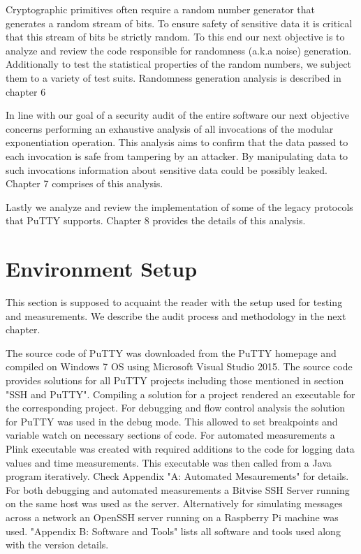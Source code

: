 \documentclass{report}
\begin{document}
Cryptographic primitives often require a random number generator that generates a random stream of bits. To ensure safety of sensitive data it is critical that this stream of bits be strictly random. To this end our next objective is to analyze and review the code responsible for randomness (a.k.a noise) generation. Additionally to test the statistical properties of the random numbers, we subject them to a variety of test suits. Randomness generation analysis is described in chapter 6\par
In line with our goal of a security audit of the entire software our next objective concerns performing an exhaustive analysis of all invocations of the modular exponentiation operation. This analysis aims to confirm that the data passed to each invocation is safe from tampering by an attacker. By manipulating data to such invocations information about sensitive data could be possibly leaked. Chapter 7 comprises of this analysis.\par
Lastly we analyze and review the implementation of some of the legacy protocols that PuTTY supports. Chapter 8 provides the details of this analysis.\par
\section{Environment Setup}
This section is supposed to acquaint the reader with the setup used for testing and measurements. We describe the audit process and methodology in the next chapter.\par

The source code of PuTTY was downloaded from the PuTTY homepage \cite{putty} and compiled on Windows 7 OS using Microsoft Visual Studio 2015. The source code provides solutions for all PuTTY projects including those mentioned in section "SSH and PuTTY". Compiling a solution for a project rendered an executable for the corresponding project. For debugging and flow control analysis the solution for PuTTY was used in the debug mode. This allowed to set breakpoints and variable watch on necessary sections of code. For automated measurements a Plink executable was created with required additions to the code for logging data values and time measurements. This executable was then called from a Java program iteratively. Check Appendix "A: Automated Mesaurements" for details. For both debugging and automated measurements a Bitvise SSH Server running on the same host was used as the server. Alternatively for simulating messages across a network an OpenSSH server running on a Raspberry Pi machine was used.
"Appendix B: Software and Tools" lists all software and tools used along with the version details.
\end{document}
